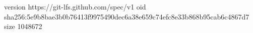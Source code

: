 version https://git-lfs.github.com/spec/v1
oid sha256:5e9b8bae3b0b76413f9975490dec6a38e659c74efc8e33b868b95cab6c4867d7
size 1048672
